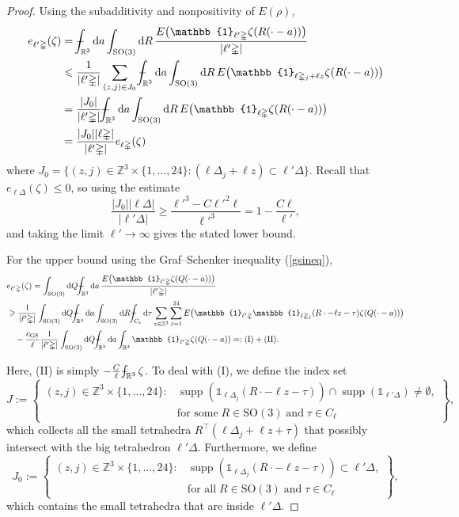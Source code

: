 \documentclass[final,onefignum,onetabnum,reqno]{amsart}
\theoremstyle{remark}
\renewcommand{\le}{\leqslant}
\renewcommand{\ge}{\geqslant}
\DeclareMathOperator{\supp}{supp}
\newcommand{\RR}{\mathbb{R}}
\newcommand{\ZZ}{\mathbb{Z}}
\newcommand{\SO}{\mathrm{SO}}
\newcommand{\GS}{\mathrm{GS}} %
\newcommand{\iden}{\mathbb{1}} %
\newcommand{\tetra}{\mathbb{\Delta}} %
\newcommand{\dd}{\mathrm{d}} %
\def\Xint#1{\mathchoice
{\XXint\displaystyle\textstyle{#1}}%
{\XXint\textstyle\scriptstyle{#1}}%
{\XXint\scriptstyle\scriptscriptstyle{#1}}%
{\XXint\scriptscriptstyle\scriptscriptstyle{#1}}%
\!\int}
\def\XXint#1#2#3{{\setbox0=\hbox{$#1{#2#3}{\int}$ }
\vcenter{\hbox{$#2#3$ }}\kern-.6\wd0}}
\def\dashint{\Xint-}
\begin{document}
\begin{proof}
Using the subadditivity and nonpositivity of $E(\rho)$, 
\begin{align*}
e_{\ell'\tetra}(\zeta)&=\dashint_{\RR^3}\dd a\int_{\SO(3)}\dd R\, \frac{E\bigl(\iden_{\ell'\tetra}\zeta(R(\cdot-a))\bigr)}{|\ell'\tetra|}\\
&\le \frac{1}{|\ell'\tetra|} \sum_{(z,j)\in J_0} \dashint_{\RR^3}\dd a\int_{\SO(3)}\dd R\, E\bigl(\iden_{\ell\tetra_j+\ell z}\zeta(R(\cdot-a))\bigr)\\
&=\frac{|J_0|}{|\ell'\tetra|} \dashint_{\RR^3}\dd a\int_{\SO(3)}\dd R\, E\bigl(\iden_{\ell\tetra}\zeta(R(\cdot-a))\bigr)\\
&=\frac{|J_0||\ell\tetra|}{|\ell'\tetra|} e_{\ell\tetra}(\zeta)
\end{align*}
where $J_0=\{(z,j)\in\ZZ^3\times\{1,\ldots,24\} : (\ell\tetra_j+\ell z)\subset \ell'\tetra\}$.
Recall that $e_{\ell\tetra}(\zeta)\le 0$, so using the estimate 
$$
\frac{|J_0||\ell\tetra|}{|\ell'\tetra|}\ge \frac{\ell'^3 - C\ell'^2\ell}{\ell'^3}=1-\frac{C\ell}{\ell'},
$$
and taking the limit $\ell'\to\infty$ gives the stated lower bound.


For the upper bound using the Graf--Schenker inequality (\cref{gsineq}),
\begin{align*}
&e_{\ell'\tetra}(\zeta)=\int_{\SO(3)}\dd Q\dashint_{\RR^3}\dd a\,\frac{E\bigl(\iden_{\ell'\tetra}\zeta(Q(\cdot-a))\bigr)}{|\ell'\tetra|} \\
&\ge \frac{1}{|\ell'\tetra|} \int_{\SO(3)}\dd Q\dashint_{\RR^3}\dd a \int_{\SO(3)}\dd R \dashint_{C_\ell}\dd\tau \sum_{z\in\ZZ^3}\sum_{j=1}^{24} 
E\bigl(\iden_{\ell'\tetra}\iden_{\ell\tetra_j}(R\cdot-\ell z-\tau)\zeta(Q(\cdot-a))\bigr) \\
&\quad -\frac{c_\GS}{\ell} \frac{1}{|\ell'\tetra|} \int_{\SO(3)}\dd Q\dashint_{\RR^3}\dd a \int_{\RR^3} \iden_{\ell'\tetra}\zeta(Q(\cdot-a))=:\mathrm{(I)} + \mathrm{(II)}.
\end{align*}

Here, (II) is simply $-\frac{C}{\ell} \dashint_{\RR^3}\zeta$. To deal with (I), we define the index set
$$
J:=\left\{ \begin{aligned}(z,j)\in \ZZ^3\times\{1,\ldots,24\} : &\supp( \iden_{\ell\tetra_j}(R\cdot - \ell z - \tau)) \cap \supp(\iden_{\ell'\tetra})\neq \emptyset,\\
&\text{for some}\;R\in\SO(3)\;\text{and}\; \tau\in C_\ell \end{aligned} \right\},
$$
which collects all the small tetrahedra $R^\top(\ell\tetra_j + \ell z + \tau)$ that possibly intersect with the big tetrahedron $\ell'\tetra$. 
Furthermore, we define
$$
J_0:=\left\{ \begin{aligned}(z,j)\in \ZZ^3\times\{1,\ldots,24\} : &\supp( \iden_{\ell\tetra_j}(R\cdot - \ell z - \tau)) \subset \ell'\tetra,\\
&\text{for all}\;R\in\SO(3)\;\text{and}\; \tau\in C_\ell \end{aligned} \right\},
$$
which contains the small tetrahedra that are inside $\ell'\tetra$.


\end{proof}
\end{document}
